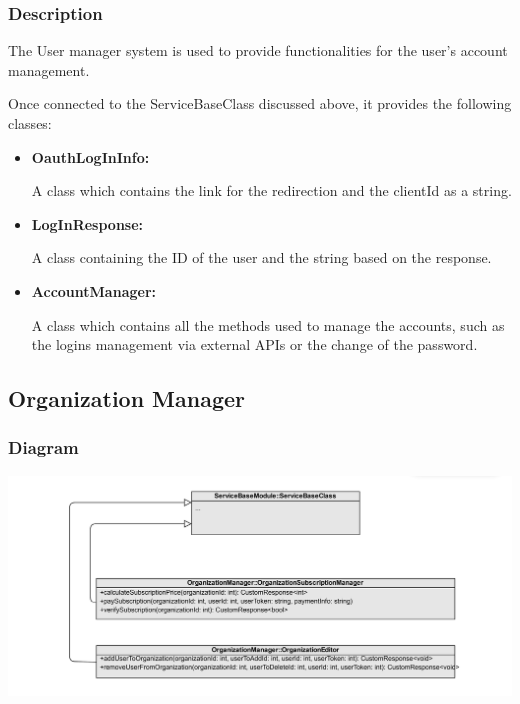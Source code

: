\documentclass{article}
\begin{document}
\subsubsection{Description}

The User manager system is used to provide functionalities for the user's account management.

Once connected to the ServiceBaseClass discussed above, it provides the following classes:

\begin{itemize}
  \item \textbf{OauthLogInInfo: }
  
  A class which contains the link for the redirection and the clientId as a string.

  \item \textbf{LogInResponse: }
  
  A class containing the ID of the user and the string based on the response.

  \item \textbf{AccountManager: }

  A class which contains all the methods used to manage the accounts, such as the logins management via external APIs or the change of the password.
\end{itemize}
\subsection{Organization Manager}


\subsubsection{Diagram}
\includegraphics[width=\textwidth,height=\textheight,keepaspectratio]{images/class_diagram/OrganizationManager.jpg}
\end{document}
